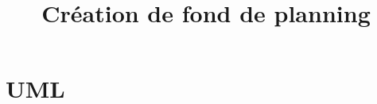 \documentclass{polytech/polytech}
\title{Création de fond de planning}
\begin{document}
	\part{UML}
\end{document}
